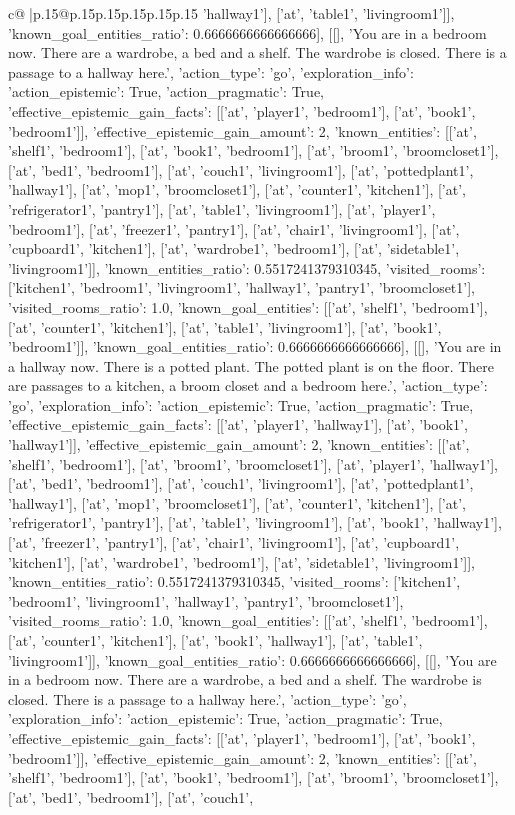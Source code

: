 \documentclass{article}
\begin{document}
{\begin{supertabular}{c@{$\;$}|p{.15\linewidth}@{}p{.15\linewidth}p{.15\linewidth}p{.15\linewidth}p{.15\linewidth}p{.15\linewidth}}
{{{'hallway1'], ['at', 'table1', 'livingroom1']], 'known_goal_entities_ratio': 0.6666666666666666}}], [[], 'You are in a bedroom now. There are a wardrobe, a bed and a shelf. The wardrobe is closed. There is a passage to a hallway here.', {'action_type': 'go', 'exploration_info': {'action_epistemic': True, 'action_pragmatic': True, 'effective_epistemic_gain_facts': [['at', 'player1', 'bedroom1'], ['at', 'book1', 'bedroom1']], 'effective_epistemic_gain_amount': 2, 'known_entities': [['at', 'shelf1', 'bedroom1'], ['at', 'book1', 'bedroom1'], ['at', 'broom1', 'broomcloset1'], ['at', 'bed1', 'bedroom1'], ['at', 'couch1', 'livingroom1'], ['at', 'pottedplant1', 'hallway1'], ['at', 'mop1', 'broomcloset1'], ['at', 'counter1', 'kitchen1'], ['at', 'refrigerator1', 'pantry1'], ['at', 'table1', 'livingroom1'], ['at', 'player1', 'bedroom1'], ['at', 'freezer1', 'pantry1'], ['at', 'chair1', 'livingroom1'], ['at', 'cupboard1', 'kitchen1'], ['at', 'wardrobe1', 'bedroom1'], ['at', 'sidetable1', 'livingroom1']], 'known_entities_ratio': 0.5517241379310345, 'visited_rooms': ['kitchen1', 'bedroom1', 'livingroom1', 'hallway1', 'pantry1', 'broomcloset1'], 'visited_rooms_ratio': 1.0, 'known_goal_entities': [['at', 'shelf1', 'bedroom1'], ['at', 'counter1', 'kitchen1'], ['at', 'table1', 'livingroom1'], ['at', 'book1', 'bedroom1']], 'known_goal_entities_ratio': 0.6666666666666666}}], [[], 'You are in a hallway now. There is a potted plant. The potted plant is on the floor. There are passages to a kitchen, a broom closet and a bedroom here.', {'action_type': 'go', 'exploration_info': {'action_epistemic': True, 'action_pragmatic': True, 'effective_epistemic_gain_facts': [['at', 'player1', 'hallway1'], ['at', 'book1', 'hallway1']], 'effective_epistemic_gain_amount': 2, 'known_entities': [['at', 'shelf1', 'bedroom1'], ['at', 'broom1', 'broomcloset1'], ['at', 'player1', 'hallway1'], ['at', 'bed1', 'bedroom1'], ['at', 'couch1', 'livingroom1'], ['at', 'pottedplant1', 'hallway1'], ['at', 'mop1', 'broomcloset1'], ['at', 'counter1', 'kitchen1'], ['at', 'refrigerator1', 'pantry1'], ['at', 'table1', 'livingroom1'], ['at', 'book1', 'hallway1'], ['at', 'freezer1', 'pantry1'], ['at', 'chair1', 'livingroom1'], ['at', 'cupboard1', 'kitchen1'], ['at', 'wardrobe1', 'bedroom1'], ['at', 'sidetable1', 'livingroom1']], 'known_entities_ratio': 0.5517241379310345, 'visited_rooms': ['kitchen1', 'bedroom1', 'livingroom1', 'hallway1', 'pantry1', 'broomcloset1'], 'visited_rooms_ratio': 1.0, 'known_goal_entities': [['at', 'shelf1', 'bedroom1'], ['at', 'counter1', 'kitchen1'], ['at', 'book1', 'hallway1'], ['at', 'table1', 'livingroom1']], 'known_goal_entities_ratio': 0.6666666666666666}}], [[], 'You are in a bedroom now. There are a wardrobe, a bed and a shelf. The wardrobe is closed. There is a passage to a hallway here.', {'action_type': 'go', 'exploration_info': {'action_epistemic': True, 'action_pragmatic': True, 'effective_epistemic_gain_facts': [['at', 'player1', 'bedroom1'], ['at', 'book1', 'bedroom1']], 'effective_epistemic_gain_amount': 2, 'known_entities': [['at', 'shelf1', 'bedroom1'], ['at', 'book1', 'bedroom1'], ['at', 'broom1', 'broomcloset1'], ['at', 'bed1', 'bedroom1'], ['at', 'couch1', }}}
\end{supertabular}}
\end{document}
